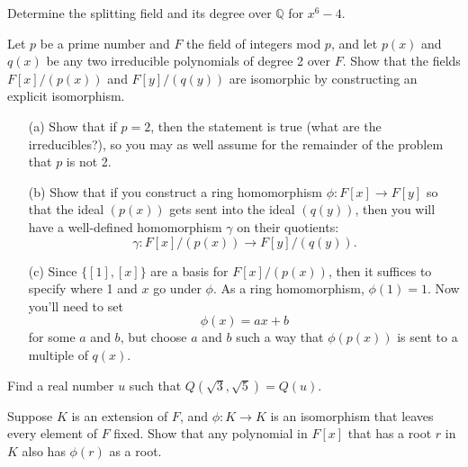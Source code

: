 \documentclass[12pt,letterpaper]{hmcpset}
\newcommand{\Qq}{\mathbb{Q}}
\begin{document}

\begin{problem}[13.4.4]
  Determine the splitting field and its degree over $\Qq$ for $x^6-4$.
\end{problem}
\begin{solution}
\vfill
\end{solution}
\newpage

\begin{problem}[B.]
  Let $p$ be a prime number and $F$ the field of integers mod $p$, and let $p(x)$ and $q(x)$ be any two irreducible polynomials of degree 2 over $F$. Show that the fields $F[x]/(p(x))$ and $F[y]/(q(y))$ are isomorphic by constructing an explicit isomorphism.
  \begin{enumerate}
    \item[(a)] Show that if $p=2$, then the statement is true (what are the irreducibles?), so you may as well assume for the remainder of the problem that $p$ is not 2.
    \item[(b)] Show that if you construct a ring homomorphism $\phi : F[x] \to F[y]$ so that the ideal $(p(x))$ gets sent into the ideal $(q(y))$, then you will have a well-defined homomorphism $\gamma$ on their quotients: $$ \gamma: F[x]/(p(x)) \to F[y]/(q(y)).$$
    \item[(c)] Since $\{[1], [x]\}$ are a basis for $F[x]/(p(x))$, then it suffices to specify where 1 and $x$ go under $\phi$. As a ring homomorphism, $\phi(1)=1$.  Now you'll need to set $$\phi(x) = ax+b $$ for some $a$ and $b$, but choose $a$ and $b$ such a way that $\phi(p(x))$ is sent to a multiple of $q(x)$.
  \end{enumerate}
\end{problem}
\begin{solution}
	\vfill
\end{solution}
\newpage

\begin{problem}[C.]
  Find a real number $u$ such that $Q(\sqrt{3},\sqrt{5})=Q(u)$.
\end{problem}
\begin{solution}
	\vfill
\end{solution}
\newpage

\begin{problem}[D.]
	Suppose $K$ is an extension of $F$, and $\phi : K \to K$ is an isomorphism that leaves every element of $F$ fixed. Show that any polynomial in $F[x]$ that has a root $r$ in $K$ also has $\phi(r)$ as a root.
\end{problem}
\begin{solution}
	\vfill
\end{solution}
\end{document}
